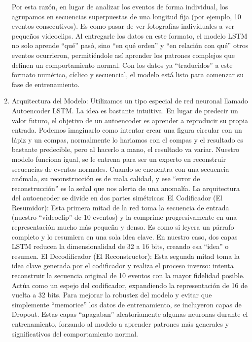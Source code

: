 \begin{enumerate}
                  Por esta razón, en lugar de analizar los eventos de forma individual, los agrupamos en secuencias superpuestas de una longitud fija (por ejemplo, 10 eventos consecutivos). Es como pasar de ver fotografías individuales a ver pequeños videoclips.
                  Al entregarle los datos en este formato, el modelo LSTM no solo aprende ``qué'' pasó, sino ``en qué orden'' y ``en relación con qué'' otros eventos ocurrieron, permitiéndole así aprender los patrones complejos que definen un comportamiento normal. Con los datos ya ``traducidos'' a este formato numérico, cíclico y secuencial, el modelo está listo para comenzar su fase de entrenamiento.

            \item Arquitectura del Modelo: Utilizamos un tipo especial de red neuronal llamado Autoencoder LSTM.
                  La idea es bastante intuitiva. En lugar de predecir un valor futuro, el objetivo de un autoencoder es aprender a reproducir su propia entrada.
                  Podemos imaginarlo como intentar crear una figura circular con un lápiz y un compas, normalmente lo hariamos con el compas y el resultado es bastante predecible, pero al hacerlo a mano, el resultado va variar.
                  Nuestro modelo funciona igual, se le entrena para ser un experto en  reconstruir secuencias de eventos normales. Cuando se encuentra con una secuencia anómala, su reconstrucción es de mala calidad, y ese ``error de reconstrucción'' es la señal que nos alerta de una anomalía.
                  La arquitectura del autoencoder se divide en dos partes simétricas:
                  El Codificador (El Resumidor): Esta primera mitad de la red toma la secuencia de entrada (nuestro ``videoclip'' de 10 eventos) y la comprime progresivamente en una representación mucho más pequeña y densa. Es como si leyera un párrafo completo y lo resumiera en una sola idea clave. En nuestro caso, dos capas LSTM reducen la dimensionalidad de 32 a 16 bits, creando esa ``idea'' o resumen.
                  El Decodificador (El Reconstructor): Esta segunda mitad toma la idea clave generada por el codificador y realiza el proceso inverso: intenta reconstruir la secuencia original de 10 eventos con la mayor fidelidad posible. Actúa como un espejo del codificador, expandiendo la representación de 16 de vuelta a 32 bits.
                  Para mejorar la robustez del modelo y evitar que simplemente ``memorice'' los datos de entrenamiento, se incluyeron capas de Dropout. Estas capas ``apagaban'' aleatoriamente algunas neuronas durante el entrenamiento, forzando al modelo a aprender patrones más generales y significativos del comportamiento normal.


\end{enumerate}
